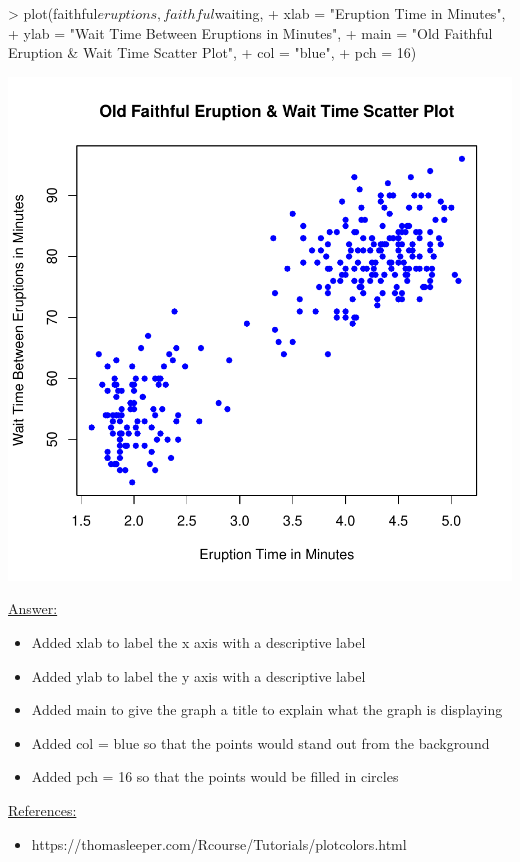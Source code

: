 \documentclass[12pt,letterpaper,final]{article}
\begin{document}
\begin{enumerate}
\begin{enumerate}
\begin{Schunk}
\begin{Sinput}
> plot(faithful$eruptions, faithful$waiting,
+      xlab = "Eruption Time in Minutes",
+      ylab = "Wait Time Between Eruptions in Minutes",
+      main = "Old Faithful Eruption & Wait Time Scatter Plot",
+      col = "blue",
+      pch = 16)
\end{Sinput}
\end{Schunk}
\includegraphics{rnw_example-013}

\underline{Answer:}
\begin{itemize}
\item Added xlab to label the x axis with a descriptive label
\item Added ylab to label the y axis with a descriptive label
\item Added main to give the graph a title to explain what the graph is displaying
\item Added col = blue so that the points would stand out from the background
\item Added pch = 16 so that the points would be filled in circles
\end{itemize}
\underline{References:}
\begin{itemize}
\item https://thomasleeper.com/Rcourse/Tutorials/plotcolors.html
\end{itemize}






\end{enumerate}
\end{enumerate}
\end{document}

